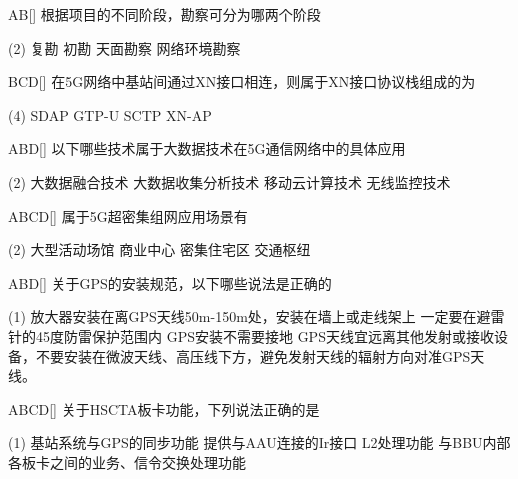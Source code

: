 \begin{choice}{\;AB\;}[]
    根据项目的不同阶段，勘察可分为哪两个阶段
    \begin{tasks}(2)
        \task 复勘
        \task 初勘
        \task 天面勘察
        \task 网络环境勘察
    \end{tasks}
\end{choice}

\begin{choice}{\;BCD\;}[]
    在5G网络中基站间通过XN接口相连，则属于XN接口协议栈组成的为
    \begin{tasks}(4)
        \task SDAP
        \task GTP-U
        \task SCTP
        \task XN-AP
    \end{tasks}
\end{choice}


\begin{choice}{\;ABD\;}[]
    以下哪些技术属于大数据技术在5G通信网络中的具体应用

    \begin{tasks}(2)
        \task 大数据融合技术
        \task 大数据收集分析技术
        \task 移动云计算技术
        \task 无线监控技术
    \end{tasks}
\end{choice}

\begin{choice}{\;ABCD\;}[]
    属于5G超密集组网应用场景有

    \begin{tasks}(2)
        \task 大型活动场馆
        \task 商业中心
        \task 密集住宅区
        \task 交通枢纽
    \end{tasks}
\end{choice}

\begin{choice}{\;ABD\;}[]
    关于GPS的安装规范，以下哪些说法是正确的

    \begin{tasks}(1)
        \task 放大器安装在离GPS天线50m-150m处，安装在墙上或走线架上
        \task 一定要在避雷针的45度防雷保护范围内
        \task GPS安装不需要接地
        \task GPS天线宜远离其他发射或接收设备，不要安装在微波天线、高压线下方，避免发射天线的辐射方向对准GPS天线。
    \end{tasks}
\end{choice}


\begin{choice}{\;ABCD\;}[]
    关于HSCTA板卡功能，下列说法正确的是

    \begin{tasks}(1)
        \task 基站系统与GPS的同步功能
        \task 提供与AAU连接的Ir接口
        \task L2处理功能
        \task 与BBU内部各板卡之间的业务、信令交换处理功能
    \end{tasks}
\end{choice}


